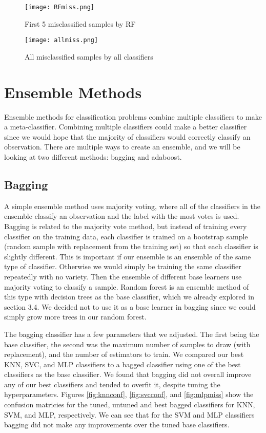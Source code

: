 \documentclass[12pt]{article}
\begin{document}
\begin{figure}[h]
	\centering
	\texttt{[image: RFmiss.png]}
	\caption{First 5 misclassified samples by RF}
	\label{fig:rfmiss}
\end{figure}
\begin{figure}[h]
	\centering
	\texttt{[image: allmiss.png]}
	\caption{All misclassified samples by all classifiers}
	\label{fig:allmiss}
\end{figure}

\FloatBarrier

\section{Ensemble Methods}

Ensemble methods for classification problems combine multiple classifiers to make a meta-classifier. Combining multiple classifiers could make a better classifier since we would hope that the majority of classifiers would correctly classify an observation. There are multiple ways to create an ensemble, and we will be looking at two different methods: bagging and adaboost.

\subsection{Bagging}

A simple ensemble method uses majority voting, where all of the classifiers in the ensemble classify an observation and the label with the most votes is used. Bagging is related to the majority vote method, but instead of training every classifier on the training data, each classifier is trained on a bootstrap sample (random sample with replacement from the training set) so that each classifier is slightly different. This is important if our ensemble is an ensemble of the same type of classifier. Otherwise we would simply be training the same classifier repeatedly with no variety. Then the ensemble of different base learners use majority voting to classify a sample. Random forest is an ensemble method of this type with decision trees as the base classifier, which we already explored in section 3.4. We decided not to use it as a base learner in bagging since we could simply grow more trees in our random forest.

The bagging classifier has a few parameters that we adjusted. The first being the base classifier, the second was the maximum number of samples to draw (with replacement), and  the number of estimators to train. We compared our best KNN, SVC, and MLP classifiers to a bagged classifier using one of the best classifiers as the base classifier. We found that bagging did not overall improve any of our best classifiers and tended to overfit it, despite tuning the hyperparameters. Figures \ref{fig:knnconf}, \ref{fig:svcconf}, and \ref{fig:mlpmiss} show the confusion matricies for the tuned, untuned and best bagged classifiers for KNN, SVM, and MLP, respectively. We can see that for the SVM and MLP classifiers bagging did not make any improvements over the tuned base classifiers.
\end{document}
